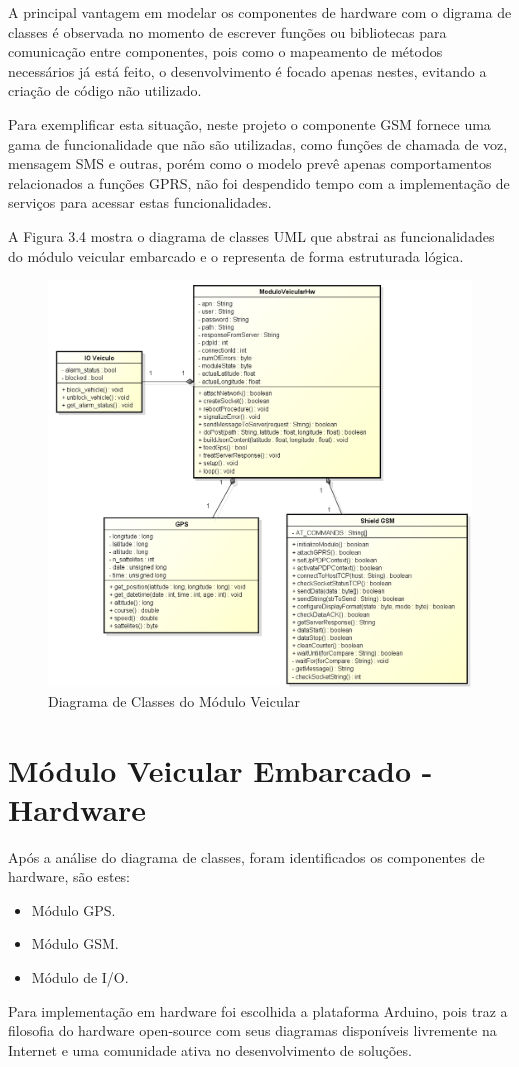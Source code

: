 A principal vantagem em modelar os componentes de hardware com o digrama de classes é observada
no momento de escrever funções ou bibliotecas para comunicação entre componentes, pois como o 
mapeamento de métodos necessários já está feito, o desenvolvimento é focado apenas nestes,
evitando a criação de código não utilizado. 

Para exemplificar esta situação, neste projeto o componente GSM fornece uma gama de funcionalidade 
que não são utilizadas, como funções de chamada de voz, mensagem SMS e outras,
porém como o modelo prevê apenas comportamentos relacionados a funções GPRS,
não foi despendido tempo com a implementação de serviços para acessar estas funcionalidades. 

A Figura 3.4 mostra o diagrama de classes UML que abstrai as funcionalidades do módulo veicular embarcado e 
o representa de forma estruturada lógica.

\newpage

\begin{figure}[!htb]
\centering
\includegraphics[width=\textwidth]{figures/5_mod_veicular.png}
\caption{Diagrama de Classes do Módulo Veicular}
\label{1}
\end{figure}

\section{Módulo Veicular Embarcado - Hardware}
Após a análise do diagrama de classes, foram identificados os componentes de hardware,
são estes:
\begin{itemize}
	\item Módulo GPS.
	\item Módulo GSM.
	\item Módulo de I/O.
\end{itemize}
Para implementação em hardware foi escolhida a plataforma Arduino, pois
traz a filosofia do hardware open-source com seus diagramas disponíveis 
livremente na Internet e uma comunidade ativa no desenvolvimento de soluções.


